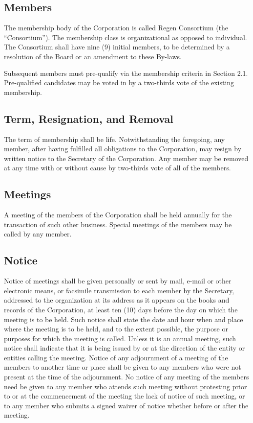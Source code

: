 \documentclass{article}
\begin{document}
\subsection{Members}
The membership body of the Corporation is called Regen Consortium (the “Consortium”). The membership class is organizational as opposed to individual. The Consortium shall have nine (9) initial members, to be determined by a resolution of the Board or an amendment to these By-laws. 

Subsequent members must pre-qualify via the membership criteria in Section 2.1. Pre-qualified candidates may be voted in by a two-thirds vote of the existing membership.
\subsection{Term, Resignation, and Removal}
The term of membership shall be life.  Notwithstanding the foregoing, any member, after having fulfilled all obligations to the Corporation, may resign by written notice to the Secretary of the Corporation. Any member may be removed at any time with or without cause by two-thirds vote of all of the members.
\subsection{Meetings}
A meeting of the members of the Corporation shall be held annually for the transaction of such other business.  Special meetings of the members may be called by any member.
\subsection{Notice}
Notice of meetings shall be given personally or sent by mail, e-mail or other electronic means, or facsimile transmission to each member by the Secretary, addressed to the organization at its address as it appears on the books and records of the Corporation, at least ten (10) days before the day on which the meeting is to be held.  Such notice shall state the date and hour when and place where the meeting is to be held, and to the extent possible, the purpose or purposes for which the meeting is called.  Unless it is an annual meeting, such notice shall indicate that it is being issued by or at the direction of the entity or entities calling the meeting.  Notice of any adjournment of a meeting of the members to another time or place shall be given to any members who were not present at the time of the adjournment.  No notice of any meeting of the members need be given to any member who attends such meeting without protesting prior to or at the commencement of the meeting the lack of notice of such meeting, or to any member who submits a signed waiver of notice whether before or after the meeting.
\end{document}
